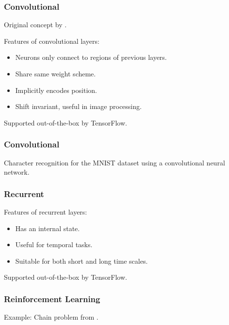 \documentclass{beamer}
\newlength{\rs}
\begin{document}
\begin{frame}
    \frametitle{Convolutional}

    Original concept by \cite{Fukushima:1980:Neocognitron}.

    Features of convolutional layers:
    \begin{itemize}
        \item Neurons only connect to regions of previous layers.
        \item Share same weight scheme.
        \item Implicitly encodes position.
        \item Shift invariant, useful in image processing.
    \end{itemize}

    Supported out-of-the-box by TensorFlow.
\end{frame}

\begin{frame}
    \frametitle{Convolutional}

    \begin{center}
        
    \end{center}
    Character recognition for the MNIST dataset using a convolutional neural
    network.
\end{frame}

\begin{frame}
    \frametitle{Recurrent}

    Features of recurrent layers:
    \begin{itemize}
        \item Has an internal state.
        \item Useful for temporal tasks.
        \item Suitable for both short and long time scales.
    \end{itemize}

    Supported out-of-the-box by TensorFlow.
\end{frame}

\begin{frame}
    \frametitle{Reinforcement Learning}

    Example: Chain problem from \cite{Strens:2000:ABF}.
    \begin{center}
        
    \end{center}
\end{frame}
\end{document}
